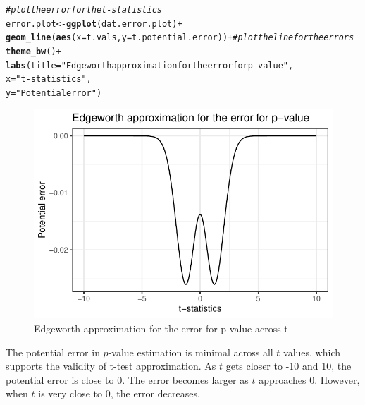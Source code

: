 \documentclass{article}\usepackage[]{graphicx}\usepackage[]{xcolor}
\makeatletter
\def\maxwidth{ %
  \ifdim\Gin@nat@width>\linewidth
    \linewidth
  \else
    \Gin@nat@width
  \fi
}
\newcommand{\hlsng}[1]{\textcolor[rgb]{0.192,0.494,0.8}{#1}}%
\newcommand{\hlcom}[1]{\textcolor[rgb]{0.678,0.584,0.686}{\textit{#1}}}%
\newcommand{\hlopt}[1]{\textcolor[rgb]{0,0,0}{#1}}%
\newcommand{\hldef}[1]{\textcolor[rgb]{0.345,0.345,0.345}{#1}}%
\newcommand{\hlkwb}[1]{\textcolor[rgb]{0.69,0.353,0.396}{#1}}%
\newcommand{\hlkwc}[1]{\textcolor[rgb]{0.333,0.667,0.333}{#1}}%
\newcommand{\hlkwd}[1]{\textcolor[rgb]{0.737,0.353,0.396}{\textbf{#1}}}%
\newenvironment{kframe}{%
 \def\at@end@of@kframe{}%
 \ifinner\ifhmode%
  \def\at@end@of@kframe{\end{minipage}}%
  \begin{minipage}{\columnwidth}%
 \fi\fi%
 \def\FrameCommand##1{\hskip\@totalleftmargin \hskip-\fboxsep
 \colorbox{shadecolor}{##1}\hskip-\fboxsep
     \hskip-\linewidth \hskip-\@totalleftmargin \hskip\columnwidth}%
 \MakeFramed {\advance\hsize-\width
   \@totalleftmargin\z@ \linewidth\hsize
   \@setminipage}}%
 {\par\unskip\endMakeFramed%
 \at@end@of@kframe}
\newenvironment{knitrout}{}{} %
\makeatother
\begin{document}
\begin{enumerate}
\begin{enumerate}
\begin{knitrout}
\begin{kframe}
\begin{alltt}
\hlcom{#plot the error for the t-statistics }
\hldef{error.plot} \hlkwb{<-} \hlkwd{ggplot}\hldef{(dat.error.plot)}\hlopt{+}
\hlkwd{geom_line}\hldef{(}\hlkwd{aes}\hldef{(}\hlkwc{x}\hldef{= t.vals,} \hlkwc{y} \hldef{= t.potential.error))}\hlopt{+} \hlcom{#plot the line for the errors}
\hlkwd{theme_bw}\hldef{()}\hlopt{+}
\hlkwd{labs}\hldef{(}\hlkwc{title} \hldef{=} \hlsng{"Edgeworth approximation for the error for p-value"}\hldef{,}
     \hlkwc{x} \hldef{=} \hlsng{"t-statistics"}\hldef{,}
     \hlkwc{y} \hldef{=} \hlsng{"Potential error"}\hldef{)}
\end{alltt}
\end{kframe}
\end{knitrout}
\begin{figure}[H] \begin{center}
\begin{knitrout}
\color{fgcolor}
\includegraphics[width=\maxwidth]{figure/unnamed-chunk-4-1} 
\end{knitrout}
\caption{Edgeworth approximation for the error for p-value across t} \label{plot.error} 
\end{center}
\end{figure}


The potential error in $p$-value estimation is minimal across all $t$ values, which supports the validity of t-test approximation. As $t$ gets closer to -10 and 10, the potential error is close to 0. The error becomes larger as $t$ approaches 0. However, when $t$ is very close to 0, the error decreases.


\end{enumerate}
\end{enumerate}
\end{document}
